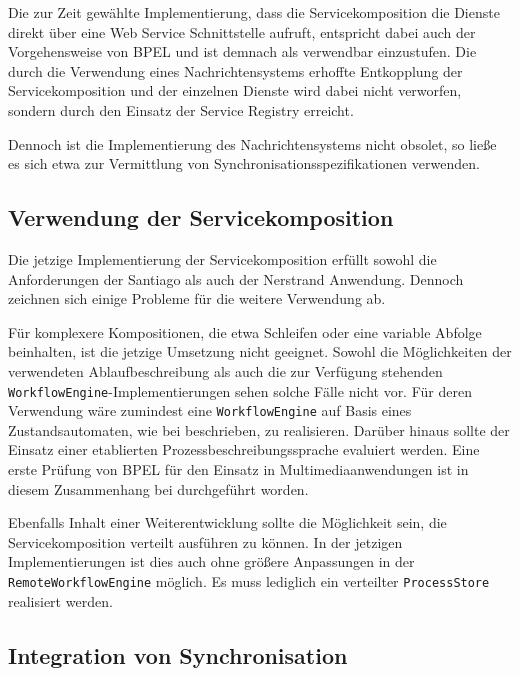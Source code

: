   Die zur Zeit gewählte Implementierung, dass die Servicekomposition die Dienste direkt über eine Web Service Schnittstelle aufruft, entspricht dabei auch der Vorgehensweise von BPEL und ist demnach als verwendbar einzustufen. Die durch die Verwendung eines Nachrichtensystems erhoffte Entkopplung der Servicekomposition und der einzelnen Dienste wird dabei nicht verworfen, sondern durch den Einsatz der Service Registry erreicht.
  
  Dennoch ist die Implementierung des Nachrichtensystems nicht obsolet, so ließe es sich etwa zur Vermittlung von Synchronisationsspezifikationen verwenden.


\subsection{Verwendung der Servicekomposition} %
\label{sub:verwendung_der_servicekomposition}

  Die jetzige Implementierung der Servicekomposition erfüllt sowohl die Anforderungen der Santiago als auch der Nerstrand Anwendung. Dennoch zeichnen sich einige Probleme für die weitere Verwendung ab.
  
  Für komplexere Kompositionen, die etwa Schleifen oder eine variable Abfolge beinhalten, ist die jetzige Umsetzung nicht geeignet. Sowohl die Möglichkeiten der verwendeten Ablaufbeschreibung als auch die zur Verfügung stehenden \verb!WorkflowEngine!-Implementierungen sehen solche Fälle nicht vor. Für deren Verwendung wäre zumindest eine \verb!WorkflowEngine! auf Basis eines Zustandsautomaten, wie bei \citep{biornstad2006cfs} beschrieben, zu realisieren. Darüber hinaus sollte der Einsatz einer etablierten Prozessbeschreibungssprache evaluiert werden. Eine erste Prüfung von BPEL für den Einsatz in Multimediaanwendungen ist in diesem Zusammenhang bei \citep{samma08} durchgeführt worden.

  Ebenfalls Inhalt einer Weiterentwicklung sollte die Möglichkeit sein, die Servicekomposition verteilt ausführen zu können. In der jetzigen Implementierungen ist dies auch ohne größere Anpassungen in der \verb!RemoteWorkflowEngine! möglich. Es muss lediglich ein verteilter \verb!ProcessStore! realisiert werden.


\subsection{Integration von Synchronisation} %
\label{sub:integration_von_synchronisation}

